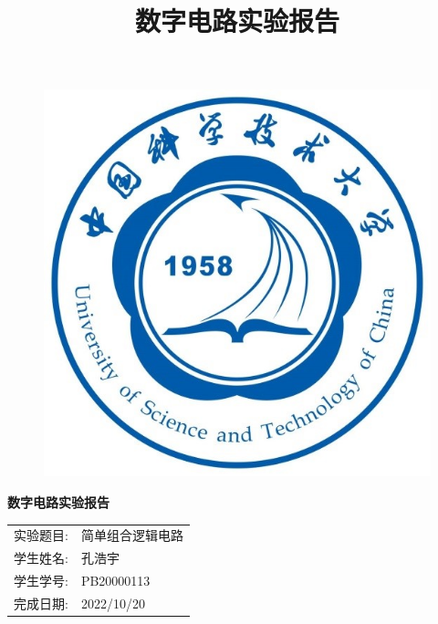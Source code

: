 \documentclass{article}
\title{\heiti 数字电路实验报告 }
\begin{document}
	\vspace*{1cm}
	
	\begin{figure}[h]
		\centering
		\includegraphics[scale=1.0]{xh.jpg}
	\end{figure}

	\vspace*{0.5cm}
	
	\begin{center}
		\Huge{\textbf{数字电路实验报告}}
	\end{center}
	
	\vspace{5cm}
	
	\begin{table}[h]
		\centering
		\begin{Large}
			\begin{tabular}{p{3cm} p{7cm}<{\centering}}
				实验题目: &  简单组合逻辑电路     \\ \cline{2-2}
				学生姓名:      & 孔浩宇   \\ \cline{2-2}
				学生学号: & PB20000113 \\ \cline{2-2}
				完成日期:       & 2022/10/20 \\ \cline{2-2}
			\end{tabular}
		\end{Large}		
	\end{table}
	\newpage
\end{document}
